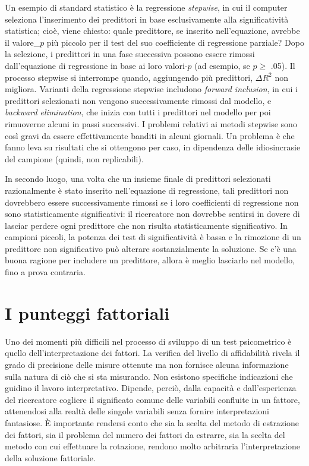 \documentclass[
  11pt,
]{krantz}
\begin{document}
Un esempio di standard statistico è la regressione \emph{stepwise}, in cui il computer seleziona l'inserimento dei predittori in base esclusivamente alla significatività statistica; cioè, viene chiesto: quale predittore, se inserito nell'equazione, avrebbe il valore\_\(p\) più piccolo per il test del suo coefficiente di regressione parziale? Dopo la selezione, i predittori in una fase successiva possono essere rimossi dall'equazione di regressione in base ai loro valori-\(p\) (ad esempio, se \(p \geq\) .05). Il processo stepwise si interrompe quando, aggiungendo più predittori, \(\Delta R^2\) non migliora. Varianti della regressione stepwise includono \emph{forward inclusion}, in cui i predittori selezionati non vengono successivamente rimossi dal modello, e \emph{backward elimination}, che inizia con tutti i predittori nel modello per poi rimuoverne alcuni in passi successivi. I problemi relativi ai metodi stepwise sono così gravi da essere effettivamente banditi in alcuni giornali. Un problema è che fanno leva su risultati che si ottengono per caso, in dipendenza delle idiosincrasie del campione (quindi, non replicabili).

In secondo luogo, una volta che un insieme finale di predittori selezionati razionalmente è stato inserito nell'equazione di regressione, tali predittori non dovrebbero essere successivamente rimossi se i loro coefficienti di regressione non sono statisticamente significativi: il ricercatore non dovrebbe sentirsi in dovere di lasciar perdere ogni predittore che non risulta statisticamente significativo. In campioni piccoli, la potenza dei test di significatività è bassa e la rimozione di un predittore non significativo può alterare sostanzialmente la soluzione. Se c'è una buona ragione per includere un predittore, allora è meglio lasciarlo nel modello, fino a prova contraria.

\hypertarget{ch:factor-scores}{%
\chapter{I punteggi fattoriali}\label{ch:factor-scores}}

Uno dei momenti più difficili nel processo di sviluppo di un test psicometrico è quello dell'interpretazione dei fattori. La verifica del livello di affidabilità rivela il grado di precisione delle misure ottenute ma non fornisce alcuna informazione sulla natura di ciò che si sta misurando. Non esistono specifiche indicazioni che guidino il lavoro interpretativo. Dipende, perciò, dalla capacità e dall'esperienza del ricercatore cogliere il significato comune delle variabili confluite in un fattore, attenendosi alla realtà delle singole variabili senza fornire interpretazioni fantasiose. È importante rendersi conto che sia la scelta del metodo di estrazione dei fattori, sia il problema del numero dei fattori da estrarre, sia la scelta del metodo con cui effettuare la rotazione, rendono molto arbitraria l'interpretazione della soluzione fattoriale.
\end{document}
